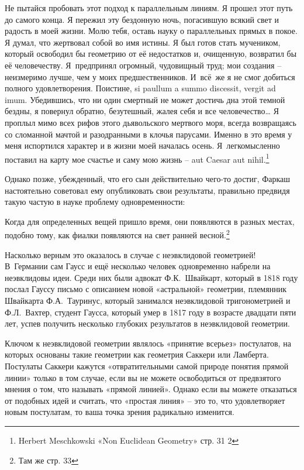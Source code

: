 \documentclass[../main.tex]{subfiles}
\begin{document}
Не пытайся пробовать этот подход к параллельным линиям. Я прошел этот путь до самого конца. Я пережил эту бездонную ночь, погасившую всякий свет и радость в моей жизни. Молю тебя, оставь науку о параллельных прямых в покое. Я думал, что жертвовал собой во имя истины. Я был готов стать мучеником, который освободил бы геометрию от её недостатков и, очищенную, возвратил бы её человечеству. Я~предпринял огромный, чудовищный труд; мои создания \--- неизмеримо лучше, чем у моих предшественников. И~всё~же я не смог добиться полного удовлетворения. Поистине, si paullum a summo discessit, vergit ad imum. Убедившись, что ни один смертный не может достичь дна этой темной бездны, я повернул обратно, безутешный, жалея себя и все человечество\ldots{} Я проплыл мимо всех рифов этого дьявольского мертвого моря, всегда возвращаясь со сломанной мачтой и разодранными в клочья парусами. Именно в это время у меня испортился характер и в жизни моей началась осень. Я~легкомысленно поставил на карту мое счастье и саму мою жизнь \--- aut Caesar aut nihil.\footnote{Herbert Meschkowski «Non Euclidean Geometry» стр. 31 2}

Однако позже, убежденный, что его сын действительно чего-то достиг, Фаркаш настоятельно советовал ему опубликовать свои результаты, правильно предвидя такую частую в науке проблему одновременности:

Когда для определенных вещей пришло время, они появляются в разных местах, подобно тому, как фиалки появляются на свет ранней весной.\footnote{Там же стр. 33}

Насколько верным это оказалось в случае с неэвклидовой геометрией! В~Германии сам Гаусс и ещё несколько человек одновременно набрели на неэвклидовы идеи. Среди них были адвокат Ф.К.~Швайкарт, который в 1818 году послал Гауссу письмо с описанием новой «астральной» геометрии, племянник Швайкарта Ф.А.~Тауринус, который занимался неэвклидовой тригонометрией и Ф.Л.~Вахтер, студент Гаусса, который умер в 1817 году в возрасте двадцати пяти лет, успев получить несколько глубоких результатов в неэвклидовой геометрии.

Ключом к неэвклидовой геометрии являлось «принятие всерьез» постулатов, на которых основаны такие геометрии как геометрия Саккери или Ламберта. Постулаты Саккери кажутся «отвратительными самой природе понятия прямой линии» только в том случае, если вы не можете освободиться от предвзятого мнения о том, что называть «прямой линией». Однако если вы можете отказаться от подобных идей и считать, что «простая линия» \--- это то, что удовлетворяет новым постулатам, то ваша точка зрения радикально изменится.
\end{document}
